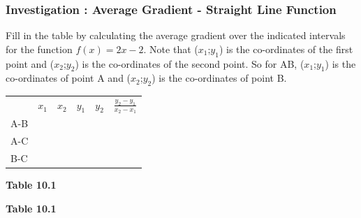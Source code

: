             \subsubsection{  Investigation : Average Gradient - Straight Line Function }
            \nopagebreak
      \label{m39213*id189861}Fill in the table by calculating the average gradient over the indicated
intervals for the function $f\left(x\right)=2x-2$. Note that (${x}_{1}$;${y}_{1}$) is the co-ordinates of the first point and (${x}_{2}$;${y}_{2}$) is the co-ordinates of the second point. So for AB, (${x}_{1}$;${y}_{1}$) is the co-ordinates of point A and (${x}_{2}$;${y}_{2}$) is the co-ordinates of point B.\par 
      \label{m39213*id189893}
          \begin{table}[H]
        \begin{center}
      \label{m39213*id189899}
    \noindent
      \tablelasttail{}
      \begin{xtabular}[t]{|l|l|l|l|l|l|}\hline
         &
                  ${x}_{1}$
                 &
                  ${x}_{2}$
                 &
                  ${y}_{1}$
                 &
                  ${y}_{2}$
                 &
                  $\frac{{y}_{2}-{y}_{1}}{{x}_{2}-{x}_{1}}$
     \tabularnewline{}
        A-B &
         &
         &
         &
         &
     \tabularnewline{}
        A-C &
         &
         &
         &
         &
     \tabularnewline{}
        B-C &
         &
         &
         &
         &
     \tabularnewline{}
    \end{xtabular}
      \end{center}
    \begin{center}{\small\bfseries Table 10.1}\end{center}
    \begin{caption}{\small\bfseries Table 10.1}\end{caption}
\end{table}
